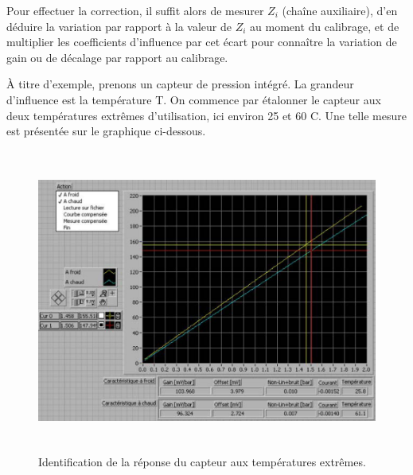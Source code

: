 \begin{center}
\end{center}

Pour effectuer la correction, il suffit alors de mesurer $Z_i$ (chaîne auxiliaire), d'en déduire la variation par rapport à la valeur de $Z_i$ au moment du calibrage, et de multiplier les coefficients d'influence par cet écart pour connaître la variation de gain ou de décalage par rapport au calibrage.

À titre d'exemple, prenons un capteur de pression intégré. La grandeur d'influence est la température T. On commence par étalonner le capteur aux deux températures extrêmes d'utilisation, ici environ 25 et 60 \degre C. Une telle mesure est présentée sur le graphique ci-dessous.

\begin{figure}
\centering
\includegraphics[height=10cm]{assets/figures/3_5_identification_reponse_en_temperature.PNG}
\caption{ Identification de la réponse du capteur aux températures extrêmes.}
\label{fig:IdentificationTemperature}
\end{figure}

